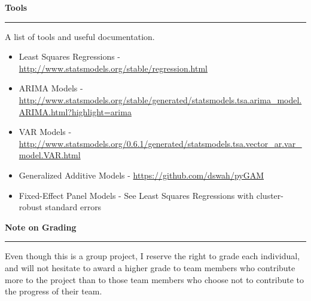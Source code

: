 \documentclass{article}
\begin{document}
\vspace*{2em}
\noindent \Large \textbf{Tools}\\[-.8em]\hrule \vspace*{.5em}
\large \noindent A list of tools and useful documentation.\vspace*{.5em}

\begin{itemize}

\item Least Squares Regressions - \url{http://www.statsmodels.org/stable/regression.html}
\item ARIMA Models - \url{http://www.statsmodels.org/stable/generated/statsmodels.tsa.arima_model.ARIMA.html?highlight=arima}
\item VAR Models - \url{http://www.statsmodels.org/0.6.1/generated/statsmodels.tsa.vector_ar.var_model.VAR.html}
\item Generalized Additive Models - \url{https://github.com/dswah/pyGAM}
\item Fixed-Effect Panel Models - See Least Squares Regressions with cluster-robust standard errors

\end{itemize}

\vspace*{2em}
\noindent \Large \textbf{Note on Grading}\\[-.8em]\hrule \vspace*{.5em}
\large \noindent Even though this is a group project, I reserve the right to grade each individual, and will not hesitate to award a higher grade to team members who contribute more to the project than to those team members who choose not to contribute to the progress of their team.\vspace*{.5em}
\end{document}
